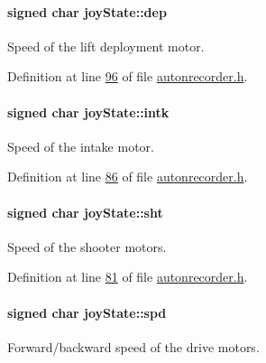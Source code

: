 \paragraph[{\texorpdfstring{dep}{dep}}]{\setlength{\rightskip}{0pt plus 5cm}signed char joy\+State\+::dep}\hypertarget{structjoy_state_a3ba5ee3c4eec0e2ee03338b397a17958}{}\label{structjoy_state_a3ba5ee3c4eec0e2ee03338b397a17958}
Speed of the lift deployment motor. 

Definition at line \hyperlink{autonrecorder_8h_source_l00096}{96} of file \hyperlink{autonrecorder_8h_source}{autonrecorder.\+h}.

\paragraph[{\texorpdfstring{intk}{intk}}]{\setlength{\rightskip}{0pt plus 5cm}signed char joy\+State\+::intk}\hypertarget{structjoy_state_a2314ed43be31ccc565381efd8398b921}{}\label{structjoy_state_a2314ed43be31ccc565381efd8398b921}
Speed of the intake motor. 

Definition at line \hyperlink{autonrecorder_8h_source_l00086}{86} of file \hyperlink{autonrecorder_8h_source}{autonrecorder.\+h}.

\paragraph[{\texorpdfstring{sht}{sht}}]{\setlength{\rightskip}{0pt plus 5cm}signed char joy\+State\+::sht}\hypertarget{structjoy_state_a751363be4e40b27bcbe558f41a15fe91}{}\label{structjoy_state_a751363be4e40b27bcbe558f41a15fe91}
Speed of the shooter motors. 

Definition at line \hyperlink{autonrecorder_8h_source_l00081}{81} of file \hyperlink{autonrecorder_8h_source}{autonrecorder.\+h}.

\paragraph[{\texorpdfstring{spd}{spd}}]{\setlength{\rightskip}{0pt plus 5cm}signed char joy\+State\+::spd}\hypertarget{structjoy_state_a7867156ddb5bc22d57010c5af00c98af}{}\label{structjoy_state_a7867156ddb5bc22d57010c5af00c98af}
Forward/backward speed of the drive motors. 

